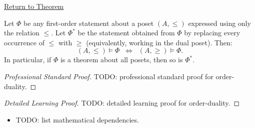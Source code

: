 \newpage
{}
\label{prf:order-duality}

\begin{remark*}[Return]
\hyperref[prop:order-duality]{Return to Theorem}
\end{remark*}

\begin{proposition*}
Let $\Phi$ be any first-order statement about a poset $(A, \leq)$ expressed
using only the relation $\leq$.  Let $\Phi^*$ be the statement obtained from
$\Phi$ by replacing every occurrence of $\leq$ with $\geq$ (equivalently,
working in the dual poset).  Then:
\[
  (A, \leq) \models \Phi
  \;\;\Longleftrightarrow\;\;
  (A, \geq) \models \Phi.
\]
In particular, if $\Phi$ is a theorem about all posets, then so is $\Phi^*$.
\end{proposition*}

\begin{proof}[Professional Standard Proof]
\LRAProofBodyStart
TODO: professional standard proof for order-duality.
\end{proof}

\begin{proof}[Detailed Learning Proof]
\LRAProofBodyStart
TODO: detailed learning proof for order-duality.
\end{proof}

\begin{remark*}
\end{remark*}

\begin{dependencies}
\begin{itemize}
  \item TODO: list mathematical dependencies.
\end{itemize}
\end{dependencies}

\clearpage
